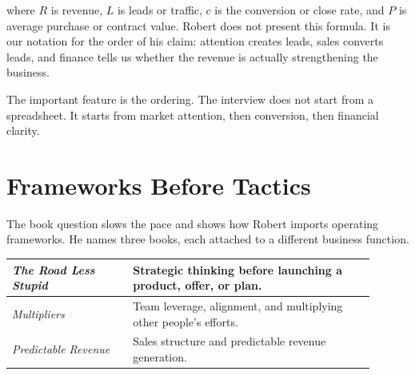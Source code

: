 where \(R\) is revenue, \(L\) is leads or traffic, \(c\) is the conversion or close rate, and \(P\) is average purchase or contract value. Robert does not present this formula. It is our notation for the order of his claim: attention creates leads, sales converts leads, and finance tells us whether the revenue is actually strengthening the business.

\begin{figure}
\centering
{}
\end{figure}

The important feature is the ordering. The interview does not start from a spreadsheet. It starts from market attention, then conversion, then financial clarity.

\section{Frameworks Before Tactics}

The book question slows the pace and shows how Robert imports operating frameworks. He names three books, each attached to a different business function.

\begin{table}
\centering
\begin{tabular}{|p{0.30\linewidth}|p{0.60\linewidth}|}
\hline
\emph{The Road Less Stupid} & Strategic thinking before launching a product, offer, or plan. \\
\hline
\emph{Multipliers} & Team leverage, alignment, and multiplying other people's efforts. \\
\hline
\emph{Predictable Revenue} & Sales structure and predictable revenue generation. \\
\hline
\end{tabular}
\end{table}

